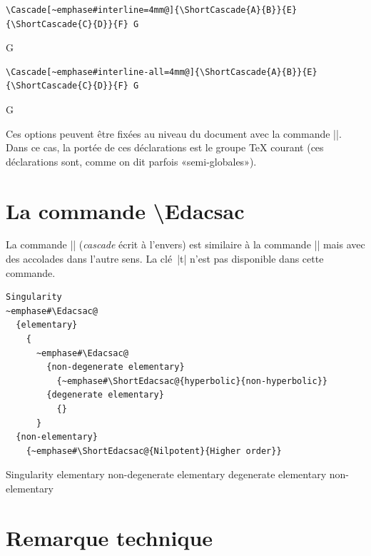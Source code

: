 \documentclass[dvipsnames]{article}%
\def\interitem{\vspace{7mm plus 2 mm minus 3mm}}
\begin{document}
\begin{Verbatim}
\Cascade[~emphase#interline=4mm@]{\ShortCascade{A}{B}}{E}{\ShortCascade{C}{D}}{F} G
\end{Verbatim}

\begin{center}
 G
\end{center}

\bigskip
\begin{Verbatim}
\Cascade[~emphase#interline-all=4mm@]{\ShortCascade{A}{B}}{E}{\ShortCascade{C}{D}}{F} G
\end{Verbatim}

\begin{center}
 G
\end{center}

\interitem
Ces options peuvent être fixées au niveau du document avec la commande 
|\CascadeOptions|. Dans ce cas, la portée de ces déclarations est le groupe TeX
courant (ces déclarations sont, comme on dit parfois «semi-globales»).

\bigskip
\section{La commande \textbackslash Edacsac}

La commande |\Edacsac| (\textsl{cascade} écrit à l'envers) est similaire à la commande |\Cascade| mais avec des
accolades dans l'autre sens. La clé~|t| n'est pas disponible dans cette commande. 

\begin{Verbatim}
Singularity 
~emphase#\Edacsac@
  {elementary}
    {
      ~emphase#\Edacsac@
        {non-degenerate elementary}
          {~emphase#\ShortEdacsac@{hyperbolic}{non-hyperbolic}}
        {degenerate elementary}
          {}
      }
  {non-elementary}
    {~emphase#\ShortEdacsac@{Nilpotent}{Higher order}}
\end{Verbatim}


Singularity 
\Edacsac
  {elementary}
  {
    \Edacsac
      {non-degenerate elementary}
      {}
      {degenerate elementary}
      {}
    }
  {non-elementary}
  {}


\bigskip
\section{Remarque technique}
\end{document}
